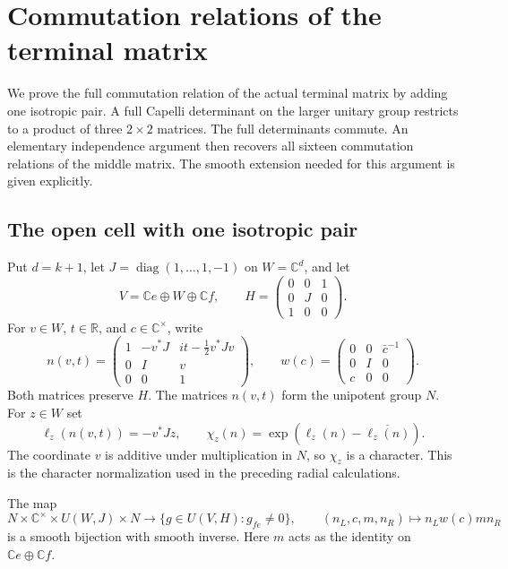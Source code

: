 \section{Commutation relations of the terminal matrix}
\label{rr-section}

We prove the full commutation relation of the actual terminal
matrix by adding one isotropic pair.  A full Capelli determinant
on the larger unitary group restricts to a product of three
$2\times2$ matrices.  The full determinants commute.
An elementary independence argument then recovers all sixteen
commutation relations of the middle matrix.
The smooth extension needed for this argument is given explicitly.

\subsection{The open cell with one isotropic pair}

Put $d=k+1$, let $J=\operatorname{diag}(1,\ldots,1,-1)$
on $W=\mathbb C^d$, and let
\[
 V=\mathbb C e\oplus W\oplus\mathbb C f,\qquad
 H=\begin{pmatrix}0&0&1\\0&J&0\\1&0&0\end{pmatrix}.
\]
For $v\in W$, $t\in\mathbb R$, and $c\in\mathbb C^\times$,
write
\[
 n(v,t)=
 \begin{pmatrix}
 1&-v^*J&it-\tfrac12v^*Jv\\
 0&I&v\\0&0&1
 \end{pmatrix},
 \qquad
 w(c)=
 \begin{pmatrix}0&0&\bar c^{-1}\\0&I&0\\c&0&0\end{pmatrix}.
\]
Both matrices preserve $H$.  The matrices $n(v,t)$ form
the unipotent group $N$.
For $z\in W$ set
\[
 \ell_z(n(v,t))=-v^*Jz,\qquad
              \chi_z(n)=\exp(\ell_z(n)-\overline{\ell_z(n)}).
\]
The coordinate $v$ is additive under multiplication in
$N$, so $\chi_z$ is a character.  This is the character
normalization used in the preceding radial calculations.

\begin{lemma}\label{rr-cell}
The map
\[
 N\times\mathbb C^\times\times U(W,J)\times N
   \longrightarrow \{g\in U(V,H):g_{fe}\ne0\},\qquad
 (n_L,c,m,n_R)\longmapsto n_Lw(c)m n_R
\]
is a smooth bijection with smooth inverse.
Here $m$ acts as the identity on $\mathbb Ce\oplus\mathbb Cf$.
\end{lemma}

